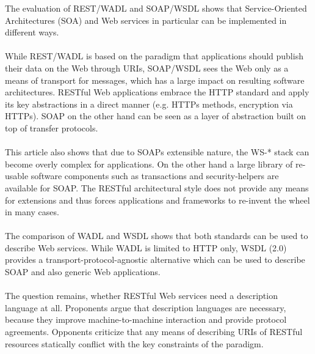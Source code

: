 The evaluation of REST/WADL and SOAP/WSDL shows that Service-Oriented Architectures (SOA) and Web services in particular can be implemented in different ways. 
\\ \\
While REST/WADL is based on the paradigm that applications should publish their data on the Web through URIs, SOAP/WSDL sees the Web only as a means of transport for messages, which has a large impact on resulting software architectures. RESTful Web applications embrace the HTTP standard and apply its key abstractions in a direct manner (e.g. HTTPs methods, encryption via HTTPs). SOAP on the other hand can be seen as a layer of abstraction built on top of transfer protocols.
\\ \\
This article also shows that due to SOAPs extensible nature, the WS-* stack can become overly complex for applications. On the other hand a large library of re-usable software components such as transactions and security-helpers are available for SOAP. The RESTful architectural style does not provide any means for extensions and thus forces applications and frameworks to re-invent the wheel in many cases.
\\ \\
The comparison of WADL and WSDL shows that both standards can be used to describe Web services. While WADL is limited to HTTP only, WSDL (2.0) provides a transport-protocol-agnostic alternative which can be used to describe SOAP and also generic Web applications. 
\\ \\
The question remains, whether RESTful Web services need a description language at all. Proponents argue that description languages are necessary, because they improve machine-to-machine interaction and provide protocol agreements. Opponents criticize that any means of describing URIs of RESTful resources statically conflict with the key constraints of the paradigm.
